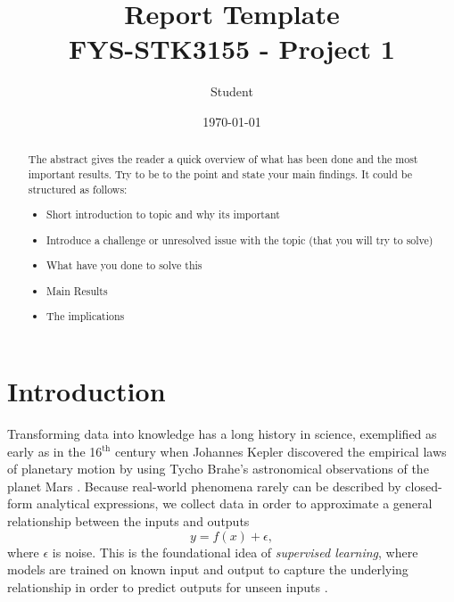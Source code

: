 \documentclass[amssymb,twocolumn,aps]{revtex4}
\begin{document}
\title{Report Template \\
    \normalsize FYS-STK3155 - Project 1}
\date{\today}
\author{Student}



\begin{abstract}
    The abstract gives the reader a quick overview of what has been done and the most important results. Try to be to the point and state your main findings. It could be structured as follows:
    \begin{itemize}
        \item Short introduction to topic and why its important
        \item Introduce a challenge or unresolved issue with the topic (that you will try to solve)
        \item What have you done to solve this
        \item Main Results
        \item The implications
    \end{itemize}
\end{abstract}

\maketitle
\section{Introduction}


Transforming data into knowledge has a long history in science, exemplified  as early as in the 16$^{\text{th}}$ century when Johannes Kepler discovered the empirical laws of planetary motion\cite{patrec} by using Tycho Brahe's astronomical observations of the planet Mars \cite{Yamahata_2024}. Because real-world phenomena rarely can be described by closed-form analytical expressions, we collect data in order to approximate a general relationship between the inputs and outputs
$$y = f(x) + \epsilon,$$
where $\epsilon$ is noise. This is the foundational idea of \textit{supervised learning}, where models are trained on known input and output to capture the underlying relationship in order to predict outputs for unseen inputs \cite{rasch5}.
\end{document}
